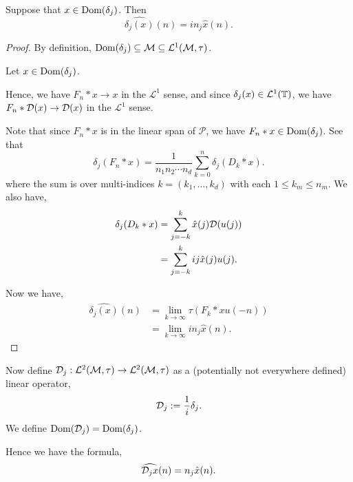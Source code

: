 \begin{proposition}
    Suppose that $x \in \operatorname{Dom}(\delta_j)$. Then 
    \begin{equation}
        \widehat{\delta_j(x)}(n) = in_j\widehat{x}(n).
    \end{equation}
\end{proposition}
\begin{proof}
    By definition, $\operatorname{Dom}(\delta_j) \subseteq \mathcal{M} \subseteq \mathcal{L}^1(\mathcal{M},\tau)$. 
    
    Let $x \in \operatorname{Dom}(\delta_j)$.
    
    Hence, we have $F_n*x\rightarrow x$ in the $\mathcal{L}^1$ sense, and since $\delta_j(x) \in \mathcal{L}^1(\mathbb{T})$, we have $F_n*\mathcal{D}(x)\rightarrow \mathcal{D}(x)$ in the $\mathcal{L}^1$ sense. 
    
    Note that since $F_n*x$ is in the linear span of $\mathcal{P}$, we
    have $F_n*x \in \operatorname{Dom}(\delta_j)$. See that
    \begin{equation}
        \delta_j(F_n *x) = \frac{1}{n_1n_2\cdots n_d}\sum_{k=0}^n \delta_j(D_k* x).
    \end{equation}
    where the sum is over multi-indices $k = (k_1,\ldots,k_d)$ with each $1\leq k_m \leq n_m$.
    We also have,
    \begin{align}
        \delta_j(D_k* x) &= \sum_{j=-k}^k \hat{x}(j)\mathcal{D}(u(j))\\
        &= \sum_{j=-k}^k ij\hat{x}(j)u(j).        
    \end{align}
    
    Now we have,
    \begin{align}
        \widehat{\delta_j(x)}(n) &= \lim_{k\rightarrow\infty} \tau(F_k*xu(-n))\\
                           &= \lim_{k\rightarrow\infty} in_j\hat{x}(n).
    \end{align} 
    
    
\end{proof}


Now define $\mathcal{D}_j:\mathcal{L}^2(\mathcal{M},\tau)\to \mathcal{L}^2(\mathcal{M},\tau)$
as a (potentially not everywhere defined) linear operator, 
\begin{equation}
    \mathcal{D}_j := \frac{1}{i} \delta_j.
\end{equation}
We define $\operatorname{Dom}(\mathcal{D}_j) = \operatorname{Dom}(\delta_j)$.

Hence we have the formula,
\begin{equation}
    \widehat{\mathcal{D}_j x}(n) = n_j\hat{x}(n).
\end{equation}

